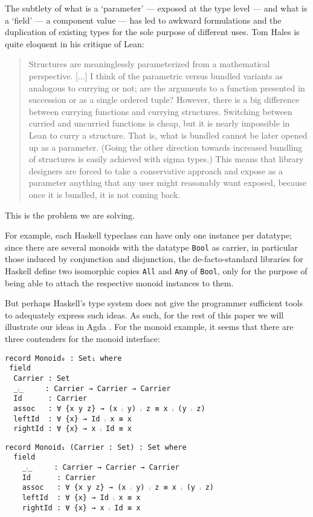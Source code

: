 \documentclass[sigplan,screen]{acmart}
\begin{document}
The subtlety of what is a ‘parameter’ --- exposed at the type level --- and what is a
‘field’ --- a component value --- has led to awkward formulations and
the duplication of existing types for the sole purpose of different uses.
Tom Hales \cite{Hales-blog-post} is quite eloquent in his critique of Lean:
\begin{quote}
  Structures are meaninglessly parameterized from a mathematical perspective.
  [...] I think of the parametric versus bundled variants as analogous to currying
  or not; are the arguments to a function presented in succession or as a single
  ordered tuple? However, there is a big difference between currying functions
  and currying structures. Switching between curried and uncurried functions is
  cheap, but it is nearly impossible in Lean to curry a structure. That is, what
  is bundled cannot be later opened up as a parameter. (Going the other direction
  towards increased bundling of structures is easily achieved with sigma types.)
 This means that library designers are forced to take a conservative approach and
 expose as a parameter anything that any user might reasonably want exposed, because
 once it is bundled, it is not coming back.
\end{quote}
This is the problem we are solving.

For example, each Haskell typeclass can have only one instance per datatype;
since there are several monoids with the datatype \texttt{Bool} as carrier,
in particular those induced by conjunction and disjunction,
the de-facto-standard libraries for Haskell
define two isomorphic copies \texttt{All} and \texttt{Any} of \texttt{Bool},
only for the purpose of being able to attach the respective monoid instances to them.

But perhaps Haskell's type system does not give the programmer sufficient
tools to adequately express such ideas. As such, for the rest of this paper
we will illustrate our ideas in Agda \cite{Norell-2007,agda_overview}.
For the monoid example,
it seems that there are three contenders for the monoid interface:

\noindent
\begin{verbatim}
record Monoid₀ : Set₁ where
 field
  Carrier : Set
  _⨾_     : Carrier → Carrier → Carrier
  Id      : Carrier
  assoc   : ∀ {x y z} → (x ⨾ y) ⨾ z ≡ x ⨾ (y ⨾ z)
  leftId  : ∀ {x} → Id ⨾ x ≡ x
  rightId : ∀ {x} → x ⨾ Id ≡ x
\end{verbatim}

\begin{verbatim}
record Monoid₁ (Carrier : Set) : Set where
  field
    _⨾_     : Carrier → Carrier → Carrier
    Id      : Carrier
    assoc   : ∀ {x y z} → (x ⨾ y) ⨾ z ≡ x ⨾ (y ⨾ z)
    leftId  : ∀ {x} → Id ⨾ x ≡ x
    rightId : ∀ {x} → x ⨾ Id ≡ x
\end{verbatim}
\end{document}
